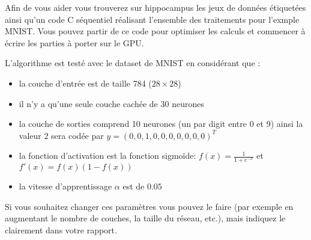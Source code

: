 \documentclass[11pt]{paper}
\begin{document}
Afin de vous aider vous trouverez sur hippocampus les jeux de données étiquetées ainsi qu'un code C séquentiel réalisant l'ensemble des traitements pour l'exmple MNIST. Vous pouvez partir de ce code pour optimiser les calculs et commencer à écrire les parties à porter sur le GPU.

L'algorithme est testé avec le dataset de MNIST en considérant que :
\begin{itemize}
	\item la couche d'entrée est de taille 784 ($28\times28$)
	\item il n'y a qu'une seule couche cachée de 30 neurones
	\item la couche de sorties comprend 10 neurones (un par digit entre 0 et 9) ainsi la valeur 2 sera codée par $y = (0,0,1,0,0,0,0,0,0,0)^T$
	\item la fonction d'activation est la fonction sigmoïde: $f(x) = \frac{1}{1+e^{-x}}$  et $f'(x) = f(x)(1-f(x))$ 
	\item la vitesse d'apprentissage $\alpha$ est de $0.05$
\end{itemize}

Si vous souhaitez changer ces paramètres vous pouvez le faire (par exemple en augmentant le nombre de couches, la taille du réseau, etc.), mais indiquez le clairement dans votre rapport.
\end{document}
